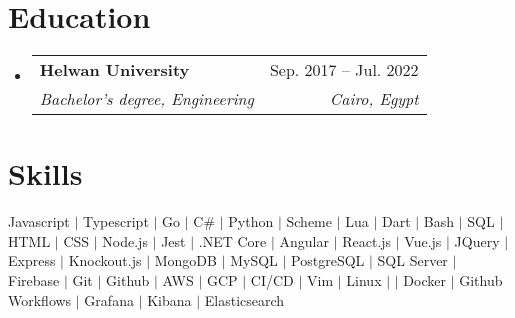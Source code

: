 \documentclass[letterpaper,11pt]{article}
\makeatletter
\newcommand{\resumeSubheading}[4]{
  \vspace{-2pt}\item
    \begin{tabular*}{0.97\textwidth}[t]{l@{\extracolsep{\fill}}r}
      \textbf{#1} & #2 \\
      \textit{\small#3} & \textit{\small #4} \\
    \end{tabular*}\vspace{-7pt}
}
\newcommand{\resumeSubHeadingListStart}{\begin{itemize}[leftmargin=0.15in, label={}]}
\newcommand{\resumeSubHeadingListEnd}{\end{itemize}}
\makeatother
\begin{document}
\section{Education}
  \resumeSubHeadingListStart
    \resumeSubheading
      {Helwan University}{Sep. 2017 -- Jul. 2022}
      {Bachelor's degree, Engineering}{Cairo, Egypt}
\resumeSubHeadingListEnd

%
\section{Skills}
 \begin{itemize}[leftmargin=0.15in, label={}]
    \small{\item{
     {Javascript $|$ Typescript $|$ Go $|$ C\# $|$ Python $|$ Scheme $|$ Lua $|$ Dart $|$ Bash $|$ SQL $|$ HTML $|$ CSS $|$ Node.js $|$ Jest $|$ .NET Core $|$ Angular $|$ React.js $|$ Vue.js $|$ JQuery $|$ Express $|$ Knockout.js $|$ MongoDB $|$ MySQL $|$ PostgreSQL $|$ SQL Server $|$ Firebase $|$ Git $|$ Github $|$ AWS $|$ GCP $|$ CI/CD $|$ Vim $|$ Linux $|$  $|$ Docker $|$ Github Workflows $|$ Grafana $|$ Kibana $|$ Elasticsearch}
    }}
 \end{itemize}


\end{document}
